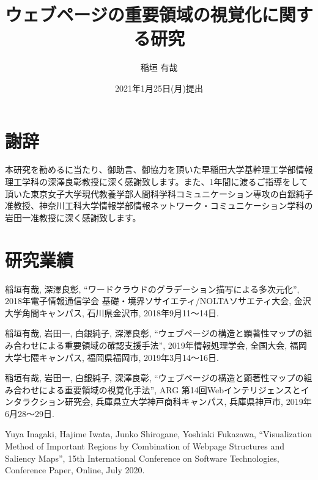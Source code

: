 \documentclass[a4j, 12pt]{jsarticle}
\title{ウェブページの重要領域の視覚化に関する研究}
\date{2021年1月25日(月)提出}
\author{稲垣 有哉}
\begin{document}
\pagestyle{empty}
\maketitle

\setcounter{page}{1}
\pagestyle{plain}
\setcounter{tocdepth}{3} %
\tableofcontents

\newpage
{}
\setcounter{page}{1} %
\pagestyle{fancy}


% 
% 
% 
% 
% 
% 

\newpage
\renewcommand{\baselinestretch}{1.5}
\section*{謝辞}
\par 本研究を勧めるに当たり、御助言、御協力を頂いた早稲田大学基幹理工学部情報理工学科の深澤良彰教授に深く感謝致します。また、1年間に渡るご指導をして頂いた東京女子大学現代教養学部人間科学科コミュニケーション専攻の白銀純子准教授、神奈川工科大学情報学部情報ネットワーク・コミュニケーション学科の岩田一准教授に深く感謝致します。

\newpage



\newpage
\section*{研究業績}
\par 稲垣有哉, 深澤良彰, “ワードクラウドのグラデーション描写による多次元化”, 2018年電子情報通信学会 基礎・境界ソサイエティ/NOLTAソサエティ大会, 金沢大学角間キャンパス, 石川県金沢市, 2018年9月11～14日.\\
\par 稲垣有哉, 岩田一, 白銀純子, 深澤良彰, “ウェブページの構造と顕著性マップの組み合わせによる重要領域の確認支援手法”, 2019年情報処理学会, 全国大会, 福岡大学七隈キャンパス, 福岡県福岡市, 2019年3月14～16日.\\
\par 稲垣有哉, 岩田一, 白銀純子, 深澤良彰, “ウェブページの構造と顕著性マップの組み合わせによる重要領域の視覚化手法”, ARG 第14回Webインテリジェンスとインタラクション研究会, 兵庫県立大学神戸商科キャンパス, 兵庫県神戸市, 2019年6月28～29日.\\
\par Yuya Inagaki, Hajime Iwata, Junko Shirogane, Yoshiaki Fukazawa, “Visualization Method of Important Regions by Combination of Webpage Structures and Saliency Maps”, 15th International Conference on Software Technologies, Conference Paper, Online, July 2020.\\


\end{document}
